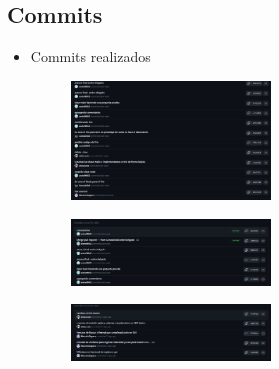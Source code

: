 \documentclass{article}
\begin{document}
	\subsection{Commits}
	\begin{itemize}
		\item Commits realizados
		\begin{figure}[H]
		\centering
		\includegraphics[width=0.5\textwidth, height=0.5\textwidth,keepaspectratio]{pruebas/commits1.png}
		\end{figure}
		\begin{figure}[H]
		\centering
		\includegraphics[width=0.5\textwidth, height=0.5\textwidth,keepaspectratio]{pruebas/commits2.png}
		\end{figure}
		\begin{figure}[H]
		\centering
		\includegraphics[width=0.5\textwidth, height=0.5\textwidth,keepaspectratio]{pruebas/commits3.png}

\end{figure}
\end{itemize}
\end{document}
